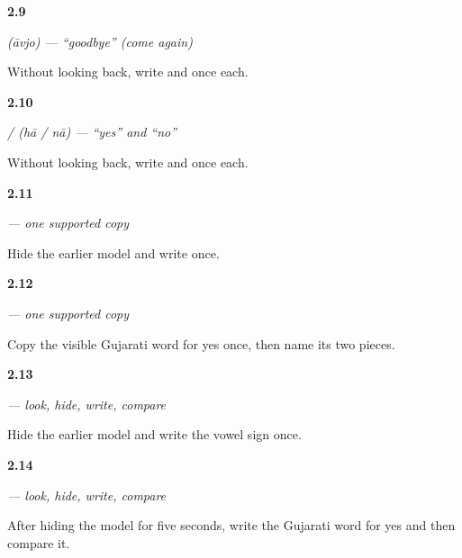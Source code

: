 \noindent\begin{minipage}[t]{\linewidth}
\raggedright
\hypertarget{review-GU-C01-aavjo-script-retrieval}{\textbf{2.9}} \emph{ (āvjo) — \textquotedblleft{}goodbye\textquotedblright{} (come again)}\par
\small Without looking back, write  and  once each.
\end{minipage}\par\medskip

\noindent\begin{minipage}[t]{\linewidth}
\raggedright
\hypertarget{review-GU-C01-haa-naa-script-retrieval}{\textbf{2.10}} \emph{ /  (hā / nā) — \textquotedblleft{}yes\textquotedblright{} and \textquotedblleft{}no\textquotedblright{}}\par
\small Without looking back, write  and  once each.
\end{minipage}\par\medskip

\noindent\begin{minipage}[t]{\linewidth}
\raggedright
\hypertarget{review-GU-W01-haa-guided-copy-dha-retrieval}{\textbf{2.11}} \emph{ — one supported copy}\par
\small Hide the earlier model and write  once.
\end{minipage}\par\medskip

\noindent\begin{minipage}[t]{\linewidth}
\raggedright
\hypertarget{review-GU-W01-haa-guided-copy-check}{\textbf{2.12}} \emph{ — one supported copy}\par
\small Copy the visible Gujarati word for yes once, then name its two pieces.
\end{minipage}\par\medskip

\noindent\begin{minipage}[t]{\linewidth}
\raggedright
\hypertarget{review-GU-W01-haa-delayed-copy-vocalic-r-retrieval}{\textbf{2.13}} \emph{ — look, hide, write, compare}\par
\small Hide the earlier model and write the vowel sign  once.
\end{minipage}\par\medskip

\noindent\begin{minipage}[t]{\linewidth}
\raggedright
\hypertarget{review-GU-W01-haa-delayed-copy-check}{\textbf{2.14}} \emph{ — look, hide, write, compare}\par
\small After hiding the model for five seconds, write the Gujarati word for yes and then compare it.
\end{minipage}\par\medskip

